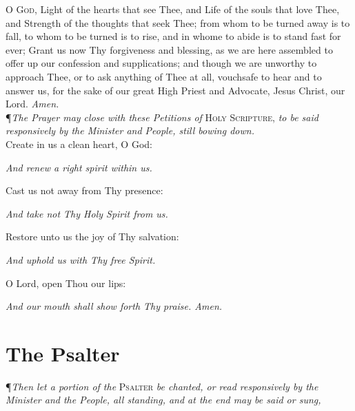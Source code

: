 \noindent\lettrine{O}{ God,} Light of the hearts that see Thee, and Life of the souls that love Thee, and Strength of the thoughts that seek Thee; from whom to be turned away is to fall, to whom to be turned is to rise, and in whome to abide is to stand fast for ever; Grant us now Thy forgiveness and blessing, as we are here assembled to offer up our confession and supplications; and though we are unworthy to approach Thee, or to ask anything of Thee at all, vouchsafe to hear and to answer us, for the sake of our great High Priest and Advocate, Jesus Christ, our Lord.
\textit{Amen.} \\

\noindent\P \textit{The Prayer may close with these Petitions of} \textsc{Holy Scripture,} \textit{to be said responsively by the Minister and People, still bowing down.} \\

Create in us a clean heart, O God: \par
\textit{And renew a right spirit within us.} \par
Cast us not away from Thy presence: \par
\textit{And take not Thy Holy Spirit from us.} \par
Restore unto us the joy of Thy salvation: \par
\textit{And uphold us with Thy free Spirit.} \par
O Lord, open Thou our lips: \par
\textit{And our mouth shall show forth Thy praise. Amen.}

\section*{The Psalter}

\P \textit{Then let a portion of the} \textsc{Psalter} \textit{be chanted, or read responsively by the Minister and the People, all standing, and at the end may be said or sung,} \\

